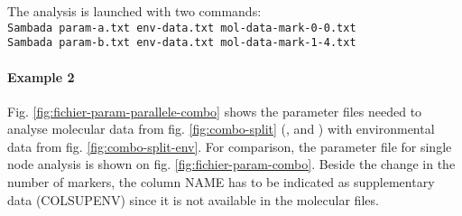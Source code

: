 \documentclass[a4paper,11pt]{article}
\begin{document}
The analysis is launched with two commands:\\
\verb+Sambada param-a.txt env-data.txt mol-data-mark-0-0.txt+\\
\verb+Sambada param-b.txt env-data.txt mol-data-mark-1-4.txt+\\


\paragraph{Example 2}

Fig. \ref{fig:fichier-param-parallele-combo} shows the parameter files needed to analyse molecular data from fig. \ref{fig:combo-split} (,  and ) with environmental data from fig. \ref{fig:combo-split-env}.
For comparison, the parameter file for single node analysis is shown on fig. \ref{fig:fichier-param-combo}.
Beside the change in the number of markers, the column NAME has to be indicated as supplementary data (COLSUPENV) since it is not available in the molecular files.
\end{document}
